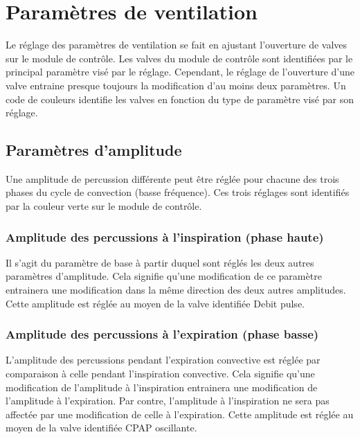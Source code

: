 \def\knobshow#1{%
\marginpar{%
	\centering
	\begin{tikzpicture}
\pic [pic text=#1, scale=1.5] {aknob};
\end{tikzpicture}%
}}

\chapter{Paramètres de ventilation}

Le réglage des paramètres de ventilation se fait en ajustant l’ouverture de
valves sur le module de contrôle. Les valves du module de contrôle sont
identifiées par le principal paramètre visé par le réglage. Cependant, le
réglage de l’ouverture d’une valve entraine presque toujours la modification
d’au moins deux paramètres. Un code de couleurs identifie les valves en
fonction du type de paramètre visé par son réglage.  

\section{Paramètres d’amplitude}

Une amplitude de percussion différente peut être réglée pour chacune des trois
phases du cycle de convection (basse fréquence).  Ces trois réglages sont
identifiés par la couleur verte sur le module de contrôle. 

\subsection{Amplitude des percussions à l’inspiration (phase haute)}

Il s’agit du paramètre de base à partir duquel sont réglés les deux autres
paramètres d’amplitude. Cela signifie qu’une modification de ce paramètre
entrainera une modification dans la même direction des deux autres amplitudes.
Cette amplitude est réglée au moyen de la valve identifiée Debit pulse.
\knobshow{D}

\subsection{Amplitude des percussions à l’expiration (phase basse)}

L’amplitude des percussions pendant l’expiration convective est réglée par
comparaison à celle pendant l’inspiration convective. Cela signifie qu’une
modification de l’amplitude à l’inspiration entrainera une modification de
l’amplitude à l’expiration. Par contre, l’amplitude à l’inspiration ne sera pas
affectée par une modification de celle à l’expiration. Cette amplitude est
réglée au moyen de la valve identifiée CPAP oscillante.
\knobshow{O}

